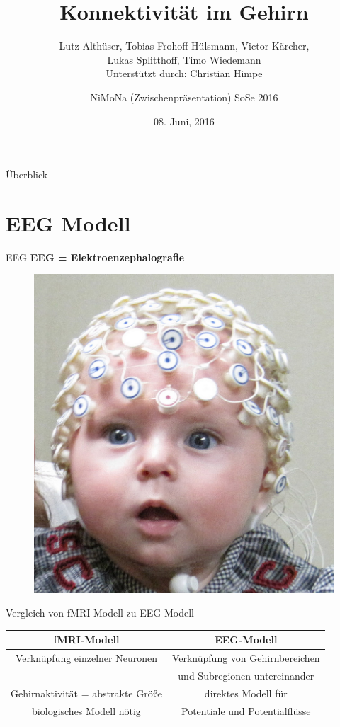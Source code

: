 \documentclass{beamer}
\author{NiMoNa (Zwischenpräsentation) SoSe 2016}
\title{Konnektivität im Gehirn}
\subtitle{Lutz Althüser, Tobias Frohoff-Hülsmann, Victor Kärcher,\\ Lukas Splitthoff, Timo Wiedemann\\ \vspace{0.25cm} Unterstützt durch: Christian Himpe}
\date[08.06.2016]{08. Juni, 2016}
\begin{document}
\begin{frame}[plain]
	  \maketitle
\end{frame}

\begin{frame}{Überblick}

	  \tableofcontents
\end{frame}

\section{EEG Modell}
\begin{frame}{EEG}
\textbf{EEG = Elektroenzephalografie}
\begin{figure}
\centering
\includegraphics[scale=0.3]{res/EEGbaby.png}
\end{figure}
\end{frame}

\begin{frame}{Vergleich von fMRI-Modell zu EEG-Modell}
\begin{tabular}{| c | c |}
\hline
\textbf{fMRI-Modell} & \textbf{EEG-Modell} \\
\hline
Verknüpfung einzelner Neuronen & Verknüpfung von Gehirnbereichen \\
&  und Subregionen untereinander \\
\hline
Gehirnaktivität = abstrakte Größe & direktes Modell für \\
biologisches Modell nötig & Potentiale und Potentialflüsse\\
\hline
\end{tabular}
\end{frame}
\end{document}
